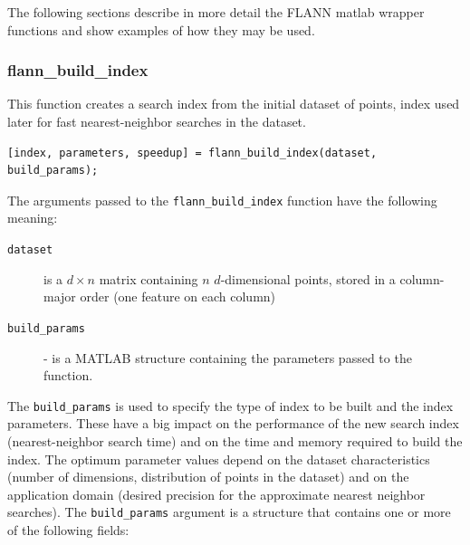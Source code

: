 \documentclass[letter,10pt]{article}
\begin{document}

The following sections describe in more detail the FLANN matlab wrapper
functions and show examples of how they may be used.

\subsubsection{flann\_build\_index}
\label{sec:flann_build_index}

This function creates a search index from the initial dataset of points,
index used  later for fast nearest-neighbor searches in the dataset.

\begin{Verbatim}[fontsize=\footnotesize,frame=single]
[index, parameters, speedup] = flann_build_index(dataset, build_params);
\end{Verbatim}


The arguments passed to the \texttt{flann\_build\_index} function have the
following meaning:
\begin{description}

\item [\texttt{dataset}] is a $d \times n$ matrix containing $n$
$d$-dimensional points, stored in a column-major order (one feature on
each column)

\item [\texttt{build\_params}] - is a MATLAB structure containing the
parameters passed to the function.

\end{description}


The \texttt{build\_params} is used to specify the type of index to be built and the 
index parameters.  These have a big impact on the performance of the new search
index (nearest-neighbor search time) and on the time and memory required to
build the index. The optimum parameter values depend on the dataset
characteristics (number of dimensions, distribution of points in the
dataset) and on the application domain (desired precision for the
approximate nearest neighbor searches). The \texttt{build\_params} argument is 
a structure that contains one or more of the following fields:
\end{document}
